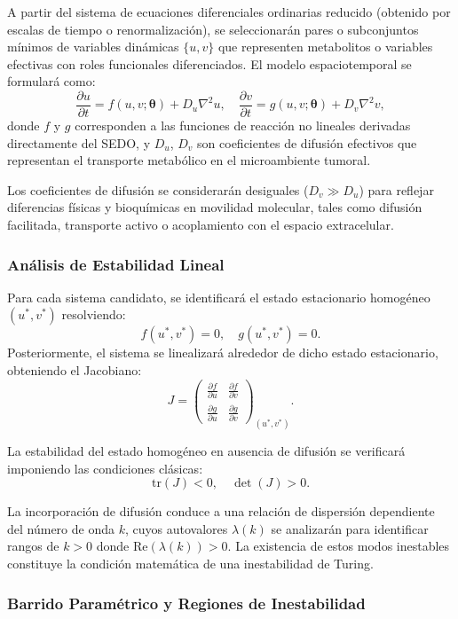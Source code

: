 \documentclass[12pt,spanish]{article}
\begin{document}
	A partir del sistema de ecuaciones diferenciales ordinarias reducido (obtenido por escalas de tiempo o renormalización), se seleccionarán pares o subconjuntos mínimos de variables dinámicas $\{u, v\}$ que representen metabolitos o variables efectivas con roles funcionales diferenciados. El modelo espaciotemporal se formulará como:
	\[
	\frac{\partial u}{\partial t} = f(u,v;\boldsymbol{\theta}) + D_u \nabla^2 u, \quad
	\frac{\partial v}{\partial t} = g(u,v;\boldsymbol{\theta}) + D_v \nabla^2 v,
	\]
	donde $f$ y $g$ corresponden a las funciones de reacción no lineales derivadas directamente del SEDO, y $D_u$, $D_v$ son coeficientes de difusión efectivos que representan el transporte metabólico en el microambiente tumoral.
	
	Los coeficientes de difusión se considerarán desiguales ($D_v \gg D_u$) para reflejar diferencias físicas y bioquímicas en movilidad molecular, tales como difusión facilitada, transporte activo o acoplamiento con el espacio extracelular.
	
	\subsubsection*{Análisis de Estabilidad Lineal}
	
	Para cada sistema candidato, se identificará el estado estacionario homogéneo $(u^*, v^*)$ resolviendo:
	\[
	f(u^*, v^*) = 0, \quad g(u^*, v^*) = 0.
	\]
	Posteriormente, el sistema se linealizará alrededor de dicho estado estacionario, obteniendo el Jacobiano:
	\[
	J =
	\begin{pmatrix}
		\frac{\partial f}{\partial u} & \frac{\partial f}{\partial v} \\
		\frac{\partial g}{\partial u} & \frac{\partial g}{\partial v}
	\end{pmatrix}_{(u^*, v^*)}.
	\]
	
	La estabilidad del estado homogéneo en ausencia de difusión se verificará imponiendo las condiciones clásicas:
	\[
	\text{tr}(J) < 0, \quad \det(J) > 0.
	\]
	
	La incorporación de difusión conduce a una relación de dispersión dependiente del número de onda $k$, cuyos autovalores $\lambda(k)$ se analizarán para identificar rangos de $k > 0$ donde $\text{Re}(\lambda(k)) > 0$. La existencia de estos modos inestables constituye la condición matemática de una inestabilidad de Turing.
	
	\subsubsection*{Barrido Paramétrico y Regiones de Inestabilidad}
	
\end{document}
